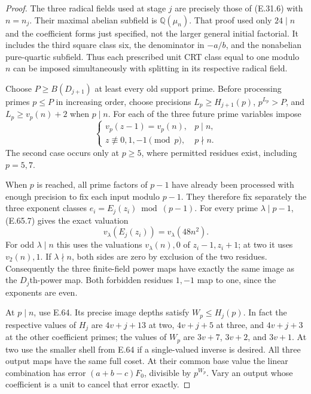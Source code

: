 \begin{proof}
The three radical fields used at
stage $j$ are precisely those of
(E.31.6) with $n=n_j$.
Their maximal abelian subfield
is $\mathbb Q(\mu_n)$.
That proof used only $24\mid n$
and the coefficient forms just
specified, not the larger
general initial factorial.
It includes the third square
class six, the denominator in
$-a/b$, and the nonabelian
pure-quartic subfield.
Thus each prescribed unit CRT
class equal to one modulo $n$
can be imposed simultaneously
with splitting in its respective
radical field.

Choose $P\geq B(D_{j+1})$ at
least every old support prime.
Before processing primes
$p\leq P$ in increasing order,
choose precisions
$L_p\geq H_{j+1}(p)$,
$p^{L_p}>P$, and
$L_p\geq v_p(n)+2$ when $p\mid n$.
For each of the three future
prime variables impose
\[
 \begin{cases}
  v_p(z-1)=v_p(n),&p\mid n,\\
  z\not\equiv0,1,-1\pmod p,&p\nmid n.
 \end{cases}
 \tag{E.65.7}
\]
The second case occurs only at
$p\geq5$, where permitted residues
exist, including $p=5,7$.

When $p$ is reached, all prime
factors of $p-1$ have already
been processed with enough
precision to fix each input
modulo $p-1$. They therefore
fix separately the three exponent
classes $e_i=E_j(z_i)\bmod(p-1)$.
For every prime $\lambda\mid p-1$,
(E.65.7) gives the exact valuation
\[
 v_\lambda(E_j(z_i))
                 =v_\lambda(48n^2).
 \tag{E.65.8}
\]
For odd $\lambda\mid n$ this uses
the valuations $v_\lambda(n),0$
of $z_i-1,z_i+1$; at two it uses
$v_2(n),1$. If $\lambda\nmid n$,
both sides are zero by exclusion
of the two residues.
Consequently the three finite-field
power maps have exactly the same
image as the $D_j$th-power map.
Both forbidden residues $1,-1$
map to one, since the exponents
are even.

At $p\mid n$, use E.64. Its
precise image depths satisfy
$W_p\leq H_j(p)$. In fact the
respective values of $H_j$ are
$4v+j+13$ at two, $4v+j+5$
at three, and $4v+j+3$ at the
other coefficient primes; the
values of $W_p$ are $3v+7$,
$3v+2$, and $3v+1$.
At two use the smaller shell
from E.64 if a single-valued
inverse is desired.
All three output maps have the
same full coset. At their common
base value the linear combination
has error $(a+b-c)F_0$, divisible
by $p^{W_p}$. Vary an output
whose coefficient is a unit to
cancel that error exactly.


\end{proof}
